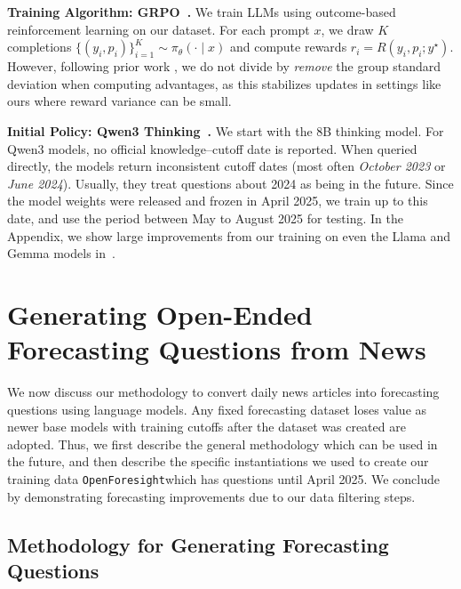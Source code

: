 \documentclass{article} %
\newcommand{\ourdataset}{\texttt{OpenForesight}}
\begin{document}
\textbf{Training Algorithm: GRPO~\citep{shao2024deepseekmath}.} 
We train LLMs using outcome-based reinforcement learning on our dataset. For each prompt $x$, we draw $K$ completions $\{(y_i,p_i)\}_{i=1}^K \sim \pi_\theta(\cdot\mid x)$ and compute rewards $r_i=R(y_i,p_i;y^\star)$. However, following prior work \citep{damani2025beyond, turtel2025outcome}, we do not divide by \emph{remove} the group standard deviation when computing advantages, as this stabilizes updates in settings like ours where reward variance can be small. \vspace{0.15cm} 

\textbf{Initial Policy: Qwen3 Thinking~\citep{yang2025qwen3technicalreport}.} We start with the 8B thinking model. For Qwen3 models, no official knowledge–cutoff date is reported. When queried directly, the models return inconsistent cutoff dates (most often \emph{October 2023} or \emph{June 2024}). Usually, they treat questions about 2024 as being in the future. Since the model weights were released and frozen in April 2025, we train up to this date, and use the period between May to August 2025 for testing. In the Appendix, we show large improvements from our training on even the Llama and Gemma models in~.




\section{Generating Open-Ended Forecasting Questions from News}
\label{sec:questions_data}

 We now discuss our methodology to convert daily news articles into forecasting questions using language models. Any fixed forecasting dataset loses value as newer base models with training cutoffs after the dataset was created are adopted. Thus, we first describe the general methodology which can be used in the future, and then describe the specific instantiations we used to create our training data \ourdataset which has questions until April 2025. We conclude by demonstrating forecasting improvements due to our data filtering steps.

\subsection{Methodology for Generating Forecasting Questions}
\label{sec:question_creation_pipeline}
\end{document}
